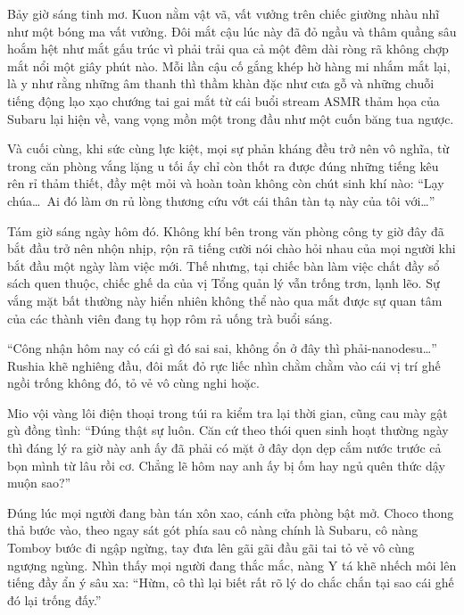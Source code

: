 \documentclass[../main.tex]{subfiles}
\begin{document}
\ct

Bảy giờ sáng tinh mơ. Kuon nằm vật vã, vất vưởng trên chiếc giường nhàu nhĩ như một bóng ma vất vưởng. Đôi mắt cậu lúc này đã đỏ ngầu và thâm quầng sâu hoắm hệt như mắt gấu trúc vì phải trải qua cả một đêm dài ròng rã không chợp mắt nổi một giây phút nào. Mỗi lần cậu cố gắng khép hờ hàng mi nhắm mắt lại, là y như rằng những âm thanh thì thầm khàn đặc như cưa gỗ và những chuỗi tiếng động lạo xạo chướng tai gai mắt từ cái buổi stream ASMR thảm họa của Subaru lại hiện về, vang vọng mồn một trong đầu như một cuốn băng tua ngược.

Và cuối cùng, khi sức cùng lực kiệt, mọi sự phản kháng đều trở nên vô nghĩa, từ trong căn phòng vắng lặng u tối ấy chỉ còn thốt ra được đúng những tiếng kêu rên rỉ thảm thiết, đầy mệt mỏi và hoàn toàn không còn chút sinh khí nào: ``Lạy chúa\dots\ Ai đó làm ơn rủ lòng thương cứu vớt cái thân tàn tạ này của tôi với\dots''

\omk

Tám giờ sáng ngày hôm đó. Không khí bên trong văn phòng công ty giờ đây đã bắt đầu trở nên nhộn nhịp, rộn rã tiếng cười nói chào hỏi nhau của mọi người khi bắt đầu một ngày làm việc mới. Thế nhưng, tại chiếc bàn làm việc chất đầy sổ sách quen thuộc, chiếc ghế da của vị Tổng quản lý vẫn trống trơn, lạnh lẽo. Sự vắng mặt bất thường này hiển nhiên không thể nào qua mắt được sự quan tâm của các thành viên đang tụ họp rôm rả uống trà buổi sáng.

``Công nhận hôm nay có cái gì đó sai sai, không ổn ở đây thì phải-nanodesu\dots'' Rushia khẽ nghiêng đầu, đôi mắt đỏ rực liếc nhìn chằm chằm vào cái vị trí ghế ngồi trống không đó, tỏ vẻ vô cùng nghi hoặc.

Mio vội vàng lôi điện thoại trong túi ra kiểm tra lại thời gian, cũng cau mày gật gù đồng tình: ``Đúng thật sự luôn. Căn cứ theo thói quen sinh hoạt thường ngày thì đáng lý ra giờ này anh ấy đã phải có mặt ở đây dọn dẹp cắm nước trước cả bọn mình từ lâu rồi cơ. Chẳng lẽ hôm nay anh ấy bị ốm hay ngủ quên thức dậy muộn sao?''

Đúng lúc mọi người đang bàn tán xôn xao, cánh cửa phòng bật mở. Choco thong thả bước vào, theo ngay sát gót phía sau cô nàng chính là Subaru, cô nàng Tomboy bước đi ngập ngừng, tay đưa lên gãi gãi đầu gãi tai tỏ vẻ vô cùng ngượng ngùng. Nhìn thấy mọi người đang thắc mắc, nàng Y tá khẽ nhếch môi lên tiếng đầy ẩn ý sâu xa: ``Hừm, cô thì lại biết rất rõ lý do chắc chắn tại sao cái ghế đó lại trống đấy.''
\end{document}
